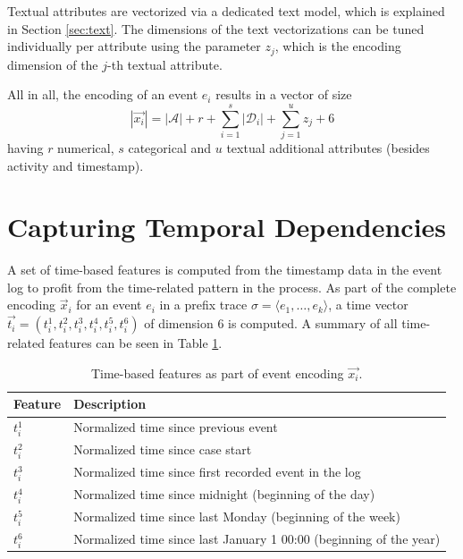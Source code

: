 Textual attributes are vectorized via a dedicated text model, which is explained in Section \ref{sec:text}.
The dimensions of the text vectorizations can be tuned individually per attribute using the parameter $z_j$, which is the encoding dimension of the $j$-th textual attribute.

All in all, the encoding of an event $e_i$ results in a vector of size
\begin{equation*}
|\vec{x_i}|= |\mathcal{A}| + r + \sum_{i=1}^{s} |\mathcal{D}_i| + \sum_{j=1}^{u} z_j + 6
\end{equation*}
having $r$ numerical, $s$ categorical and $u$ textual additional attributes (besides activity and timestamp).


\section{Capturing Temporal Dependencies}\label{sec:time}

A set of time-based features is computed from the timestamp data in the event log to profit from the time-related pattern in the process.
As part of the complete encoding $\vec{x}_i$ for an event $e_i$ in a prefix trace $\sigma = \langle e_1, \dots, e_k \rangle$, a time vector $\vec{t_i} = (t_i^1, t_i^2,t_i^3,t_i^4,t_i^5,t_i^6)$ of dimension 6 is computed.
A summary of all time-related features can be seen in Table \ref{tab:time-features}.

\begin{table}[!htbp]
	\centering
	\begin{tabularx}{\textwidth}{l l}
		\toprule
		 \textbf{Feature} & \textbf{Description} \\
		 \midrule
		$t_i^1$ & Normalized time since previous event \\
		$t_i^2$ & Normalized time since case start\\
		$t_i^3$ & Normalized time since first recorded event in the log\\
		$t_i^4$ & Normalized time since midnight (beginning of the day)\\
		$t_i^5$ & Normalized time since last Monday (beginning of the week)\\
		$t_i^6$ & Normalized time since last January 1 00:00 (beginning of the year)\\
		\bottomrule
	\end{tabularx}
	\caption[Time-based features as part of the event encoding]{Time-based features as part of event encoding $\vec{x_i}$.}
	\label{tab:time-features}
\end{table}

